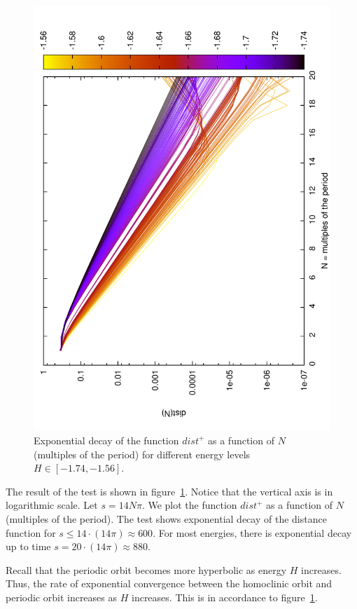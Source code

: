\documentclass[a4paper]{amsart}
\theoremstyle{remark}
\begin{document}
\begin{figure}
\includegraphics[angle=-90,width=\textwidth]{figs/omega_test}
\caption{Exponential decay of the function $dist^+$ as a function of
$N$ (multiples of the period) for different energy levels
$H\in[-1.74,-1.56]$.}
\label{fig:omega_test}
\end{figure}

The result of the test is shown in figure~\ref{fig:omega_test}.
Notice that the vertical axis is in logarithmic scale.
Let $s=14N\pi$. We plot the function $dist^+$ as a function of $N$
(multiples of the period).
The test shows exponential decay of the distance function for $s\leq
14\cdot(14\pi) \approx 600$.
For most energies, there is exponential decay up to time $s = 20\cdot
(14\pi) \approx 880$.

Recall that the periodic orbit becomes more hyperbolic as energy $H$
increases. Thus, the rate of exponential convergence between the
homoclinic orbit and periodic orbit increases as $H$ increases.
This is in accordance to figure~\ref{fig:omega_test}.
\end{document}
